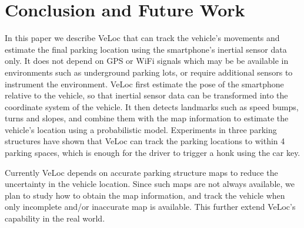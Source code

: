 \section{Conclusion and Future Work}\label{sec:conclusion}
In this paper we describe VeLoc that can track the vehicle's movements and estimate the final parking location using the smartphone's inertial sensor data only. It does not depend on GPS or WiFi signals which may be be available in environments such as underground parking lots, or require additional sensors to instrument the environment. VeLoc first estimate the pose of the smartphone relative to the vehicle, so that inertial sensor data can be transformed into the coordinate system of the vehicle. It then detects landmarks such as speed bumps, turns and slopes, and combine them with the map information to estimate the vehicle's location using a probabilistic model. Experiments in three parking structures have shown that VeLoc can track the parking locations to within 4 parking spaces, which is enough for the driver to trigger a honk using the car key.

Currently VeLoc depends on accurate parking structure maps to reduce the uncertainty in the vehicle location. Since such maps are not always available, we plan to study how to obtain the map information, and track the vehicle when only incomplete and/or inaccurate map is available. This further extend VeLoc's capability in the real world.
